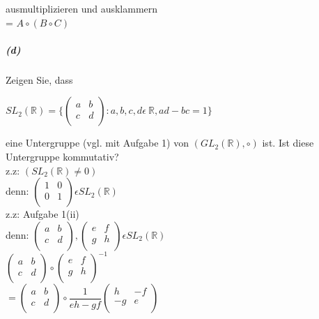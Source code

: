 \documentclass[paper=a4, fontsize=11pt]{scrartcl}
\numberwithin{equation}{section}
\numberwithin{figure}{section}
\numberwithin{table}{section}
\begin{document}
ausmultiplizieren und ausklammern \\

= $A \circ (B \circ C)$


\subparagraph{(d)} 
Zeigen Sie, dass 

\begin{center}
$SL_{2}(\mathbb{R})= \Biggl \lbrace
\begin{pmatrix}
a & b  \\
c & d  \\
\end{pmatrix} 
: a, b, c, d  \epsilon \: \mathbb{R}, ad - bc = 1 \rbrace$ 
\end{center}

eine Untergruppe (vgl. mit Aufgabe 1) von $(GL_{2}(\mathbb{R}), \circ)$ ist. Ist diese Untergruppe kommutativ? \\

z.z: $(SL_{2}(\mathbb{R}) \neq 0)$ \\
denn: $
\begin{pmatrix}
1 & 0  \\
0 & 1  \\
\end{pmatrix} 
\epsilon SL_{2}(\mathbb{R})$ \\

z.z: Aufgabe 1(ii)\\
denn: $
\begin{pmatrix}
a & b  \\
c & d  \\
\end{pmatrix} ,
\begin{pmatrix}
e & f  \\
g & h  \\
\end{pmatrix} 
\epsilon SL_{2}(\mathbb{R})$ \\

$
\begin{pmatrix}
a & b  \\
c & d  \\
\end{pmatrix} 
\circ
\begin{pmatrix}
e & f  \\
g & h  \\
\end{pmatrix}^{-1} $ \\

$ =
\begin{pmatrix}
a & b  \\
c & d  \\
\end{pmatrix} 
\circ
\dfrac{1}{eh-gf}
\begin{pmatrix}
h & -f  \\
-g & e  \\
\end{pmatrix} $ \\
\end{document}
